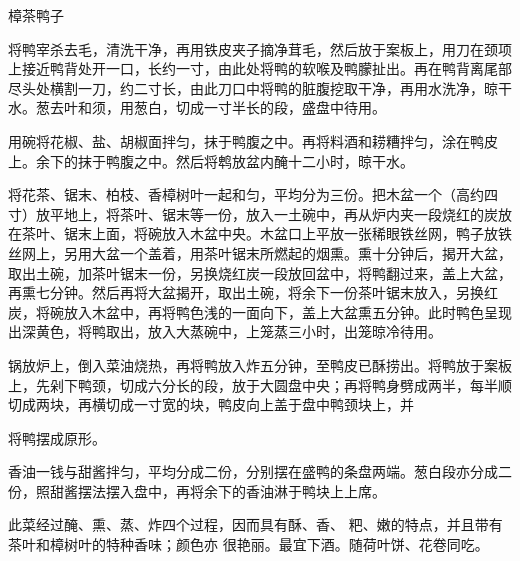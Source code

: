 \begin{recipe}{樟茶鸭子}

\ingredients


\cooking

\step 将鸭宰杀去毛，清洗干净，再用铁皮夹子摘净茸毛，然后放于案板上，用刀在颈项上接近鸭背处开一口，长约一寸，由此处将鸭的软喉及鸭朦扯出。再在鸭背离尾部尽头处横割一刀，约二寸长，由此刀口中将鸭的脏腹挖取干净，再用水洗净，晾干水。葱去叶和须，用葱白，切成一寸半长的段，盛盘中待用。

\step 用碗将花椒、盐、胡椒面拌匀，抹于鸭腹之中。再将料酒和耢糟拌匀，涂在鸭皮上。余下的抹于鸭腹之中。然后将鹎放盆内醃十二小时，晾干水。

\step 将花茶、锯末、柏枝、香樟树叶一起和匀，平均分为三份。把木盆一个（高约四寸）放平地上，将茶叶、锯末等一份，放入一土碗中，再从炉内夹一段烧红的炭放在茶叶、锯末上面，将碗放入木盆中央。木盆口上平放一张稀眼铁丝网，鸭子放铁丝网上，另用大盆一个盖着，用茶叶锯末所燃起的烟熏。熏十分钟后，揭开大盆，取出土碗，加茶叶锯末一份，另换烧红炭一段放回盆中，将鸭翻过来，盖上大盆，再熏七分钟。然后再将大盆揭开，取出土碗，将余下一份茶叶锯末放入，另换红炭，将碗放入木盆中，再将鸭色浅的一面向下，盖上大盆熏五分钟。此时鸭色呈现出深黄色，将鸭取出，放入大蒸碗中，上笼蒸三小时，出笼晾冷待用。

\step 锅放炉上，倒入菜油烧热，再将鸭放入炸五分钟，至鸭皮已酥捞出。将鸭放于案板上，先剁下鸭颈，切成六分长的段，放于大圆盘中央；再将鸭身劈成两半，每半顺切成两块，再横切成一寸宽的块，鸭皮向上盖于盘中鸭颈块上，并

将鸭摆成原形。

\step 香油一钱与甜酱拌匀，平均分成二份，分别摆在盛鸭的条盘两端。葱白段亦分成二份，照甜酱摆法摆入盘中，再将余下的香油淋于鸭块上上席。

\notes

此菜经过醃、熏、蒸、炸四个过程，因而具有酥、香、 粑、嫩的特点，并且带有茶叶和樟树叶的特种香味；颜色亦 很艳丽。最宜下酒。随荷叶饼、花卷同吃。

\end{recipe}

